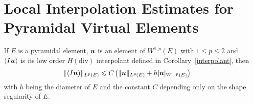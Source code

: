 \section{Local Interpolation Estimates for Pyramidal Virtual Elements}
\begin{theorem}\label{auxlabel6}
If $E$ is a pyramidal element, $\boldsymbol{u}$ is an element of $W^{1,p}(E)$ with 
$1\leqslant p\leqslant 2$
and $(I\boldsymbol{u})$ is its low order $H(\text{div})$ interpolant defined in Corollary~\ref{interpolant},
then
\begin{equation}\label{estab2}
\|(I\boldsymbol{u})\|_{L^p(E)}\leqslant C\left(\|\boldsymbol{u}\|_{L^p(E)}+ h|\boldsymbol{u}|_{W^{1,p}(E)}\right)
\end{equation}
with $h$ being the diameter of $E$ and the constant $C$ depending only on the shape regularity of $E$.
\end{theorem}
